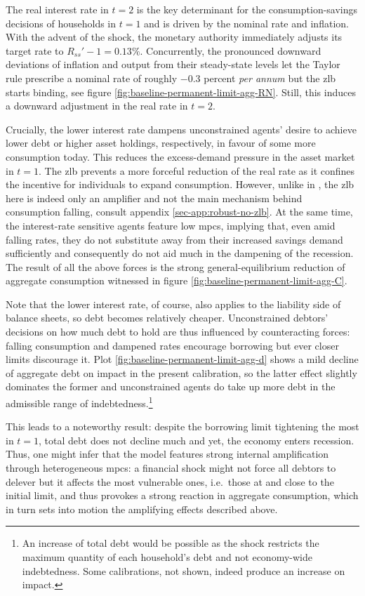 \documentclass[a4paper,12pt]{article} %
\numberwithin{equation}{section} %
\numberwithin{figure}{section}
\numberwithin{table}{section}
\begin{document}
The real interest rate in $t=2$ is the key determinant for the consumption-savings decisions of households in $t=1$ and is driven by the nominal rate and inflation. With the advent of the shock, the monetary authority immediately adjusts its target rate to $R_{ss}' - 1 = 0.13\%$. Concurrently, the pronounced downward deviations of inflation and output from their steady-state levels let the Taylor rule prescribe a nominal rate of roughly $-0.3$ percent \textit{per annum} but the \Gls{zlb} starts binding, see figure \ref{fig:baseline-permanent-limit-agg-RN}. Still, this induces a downward adjustment in the real rate in $t=2$. 

Crucially, the lower interest rate dampens unconstrained agents' desire to achieve lower debt or higher asset holdings, respectively, in favour of some more consumption today. This reduces the excess-demand pressure in the asset market in $t=1$. The \Gls{zlb} prevents a more forceful reduction of the real rate as it confines the incentive for individuals to expand consumption. However, unlike in \textcite{egg2012}, the \Gls{zlb} here is indeed only an amplifier and not the main mechanism behind consumption falling, consult appendix \ref{sec-app:robust-no-zlb}. At the same time, the interest-rate sensitive agents feature low \Gls{mpc}s, implying that, even amid falling rates, they do not substitute away from their increased savings demand sufficiently and consequently do not aid much in the dampening of the recession. The result of all the above forces is the strong general-equilibrium reduction of aggregate consumption witnessed in figure \ref{fig:baseline-permanent-limit-agg-C}.

Note that the lower interest rate, of course, also applies to the liability side of balance sheets, so debt becomes relatively cheaper. Unconstrained debtors' decisions on how much debt to hold are thus influenced by counteracting forces: falling consumption and dampened rates encourage borrowing but ever closer limits discourage it. Plot \ref{fig:baseline-permanent-limit-agg-d} shows a mild decline of aggregate debt on impact in the present calibration, so the latter effect slightly dominates the former and unconstrained agents do take up more debt in the admissible range of indebtedness.\footnote{An increase of total debt would be possible as the shock restricts the maximum quantity of each household's debt and not economy-wide indebtedness. Some calibrations, not shown, indeed produce an increase on impact.} 

This leads to a noteworthy result: despite the borrowing limit tightening the most in $t=1$, total debt does not decline much and yet, the economy enters recession. Thus, one might infer that the model features strong internal amplification through heterogeneous \Gls{mpc}s: a financial shock might not force all debtors to delever but it affects the most vulnerable ones, i.e.~those at and close to the initial limit, and thus provokes a strong reaction in aggregate consumption, which in turn sets into motion the amplifying effects described above.
\end{document}
